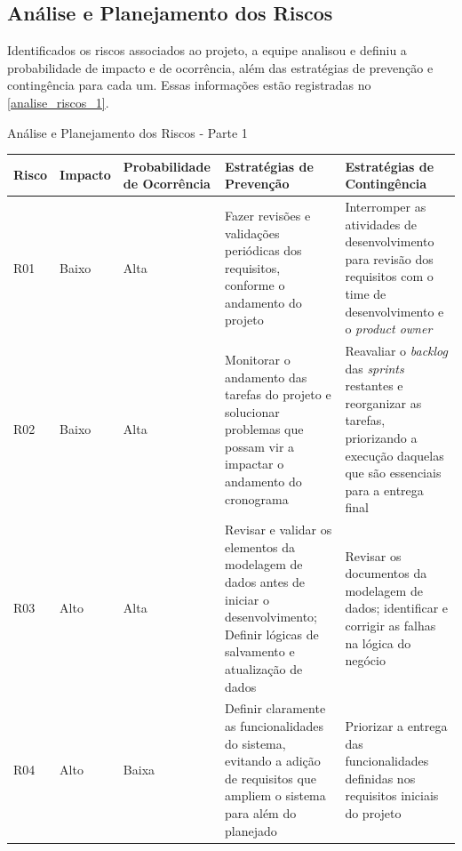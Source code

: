 \documentclass[
	12pt,				%
	openany,			%
	oneside,			%
	a4paper,			%
	english,			%
	french,				%
	spanish,			%
	brazil				%
	]{abntex2}
\begin{document}
\subsection{Análise e Planejamento dos Riscos}
Identificados os riscos associados ao projeto, a equipe analisou e definiu a probabilidade de impacto e de ocorrência, além das estratégias de prevenção e contingência para cada um. Essas informações estão registradas no \autoref{analise_riscos_1}. \\
%
\begin{quadro}[H]
	\caption{Análise e Planejamento dos Riscos - Parte 1}
	\label{analise_riscos_1} 
	\begin{tabular}{|>{\centering\arraybackslash}m{1cm}|>{\centering\arraybackslash}m{1.8cm}|>{\centering\arraybackslash}m{3cm}|>{\raggedright\arraybackslash}m{4.2cm}|>{\raggedright\arraybackslash}m{4.2cm}|}
		\hline
		\textbf{Risco} & \textbf{Impacto} & \textbf{Probabilidade de \newline Ocorrência} & \textbf{Estratégias de \newline Prevenção} & \textbf{Estratégias de \newline Contingência}\\
		\hline
		R01 & Baixo & Alta &
		Fazer revisões e validações periódicas dos requisitos, conforme o andamento do projeto  & Interromper as atividades de desenvolvimento para revisão dos requisitos com o time de desenvolvimento e o \textit{product owner}
		\\ 
		\hline
		R02 & Baixo & Alta &
		Monitorar o andamento das tarefas do projeto e solucionar problemas que possam vir a impactar o andamento do cronograma  & Reavaliar o \textit {backlog} das \textit{sprints} restantes e reorganizar as tarefas, priorizando a execução daquelas que são essenciais para a entrega final \\
		\hline
		R03 & Alto & Alta &
		Revisar e validar os elementos da modelagem de dados antes de iniciar o desenvolvimento; Definir lógicas de salvamento e atualização de dados  & Revisar os documentos da modelagem de dados;  identificar e corrigir as falhas na lógica do negócio \\
		\hline
		R04 & Alto & Baixa &
		Definir claramente as funcionalidades do sistema, evitando a adição de requisitos que ampliem o sistema para além do planejado  & Priorizar a entrega das funcionalidades definidas nos requisitos iniciais do projeto \\
		\hline
	\end{tabular}
\end{quadro}
\end{document}
